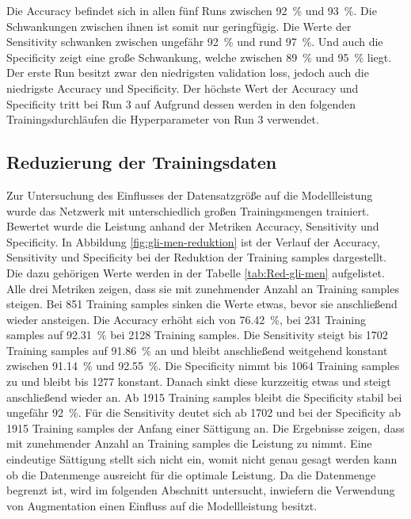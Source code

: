 Die Accuracy befindet sich in allen fünf Runs zwischen \SI{92}{\%} und \SI{93}{\%}. 
Die Schwankungen zwischen ihnen ist somit nur geringfügig.
Die Werte der Sensitivity schwanken zwischen ungefähr \SI{92}{\%} und rund \SI{97}{\%}.
Und auch die Specificity zeigt eine große Schwankung, welche zwischen \SI{89}{\%} und \SI{95}{\%} liegt.
Der erste Run besitzt zwar den niedrigsten validation loss, jedoch auch die niedrigste Accuracy und Specificity.
Der höchste Wert der Accuracy und Specificity tritt bei Run 3 auf
Aufgrund dessen werden in den folgenden Trainingsdurchläufen die Hyperparameter von Run 3 verwendet.
\subsection{Reduzierung der Trainingsdaten}
Zur Untersuchung des Einflusses der Datensatzgröße auf die Modellleistung wurde das Netzwerk mit unterschiedlich großen Trainingsmengen trainiert. 
Bewertet wurde die Leistung anhand der Metriken Accuracy, Sensitivity und Specificity.
In Abbildung \ref{fig:gli-men-reduktion} ist der Verlauf der Accuracy, Sensitivity und Specificity bei der Reduktion der Training samples dargestellt.
Die dazu gehörigen Werte werden in der Tabelle \ref{tab:Red-gli-men} aufgelistet.
Alle drei Metriken zeigen, dass sie mit zunehmender Anzahl an Training samples steigen. 
Bei 851 Training samples sinken die Werte etwas, bevor sie anschließend wieder ansteigen.
Die Accuracy erhöht sich von \SI{76.42}{\percent}, bei 231 Training samples auf \SI{92.31}{\percent} bei 2128 Training samples.
Die Sensitivity steigt bis 1702 Training samples auf \SI{91.86}{\%} an und bleibt anschließend weitgehend konstant zwischen \SI{91.14}{\%} und \SI{92.55}{\%}.
Die Specificity nimmt bis 1064 Training samples zu und bleibt bis 1277 konstant. 
Danach sinkt diese kurzzeitig etwas und steigt anschließend wieder an. 
Ab 1915 Training samples bleibt die Specificity stabil bei ungefähr \SI{92}{\%}.
Für die Sensitivity deutet sich ab 1702 und bei der Specificity ab 1915 Training samples der Anfang einer Sättigung an.
Die Ergebnisse zeigen, dass mit zunehmender Anzahl an Training samples die Leistung zu nimmt.
Eine eindeutige Sättigung stellt sich nicht ein, womit nicht genau gesagt werden kann ob die Datenmenge ausreicht für die optimale Leistung. 
Da die Datenmenge begrenzt ist, wird im folgenden Abschnitt untersucht, inwiefern die Verwendung von Augmentation einen Einfluss auf die Modellleistung besitzt. 
